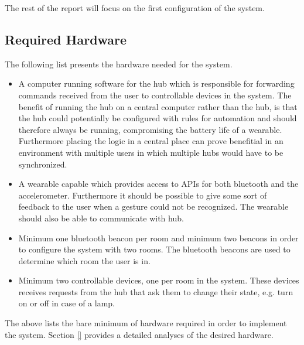 
The rest of the report will focus on the first configuration of the system.

\subsection{Required Hardware}
\label{sec:analysis:system-components:required-hardware}

The following list presents the hardware needed for the system.

\begin{itemize}
\item A computer running software for the hub which is responsible for forwarding commands received from the user to controllable devices in the system. The benefit of running the hub on a central computer rather than the hub, is that the hub could potentially be configured with rules for automation and should therefore always be running, compromising the battery life of a wearable. Furthermore placing the logic in a central place can prove benefitial in an environment with multiple users in which multiple hubs would have to be synchronized.
\item A wearable capable which provides access to APIs for both bluetooth and the accelerometer. Furthermore it should be possible to give some sort of feedback to the user when a gesture could not be recognized. The wearable should also be able to communicate with hub.
\item Minimum one bluetooth beacon per room and minimum two beacons in order to configure the system with two rooms. The bluetooth beacons are used to determine which room the user is in.
\item Minimum two controllable devices, one per room in the system. These devices receives requests from the hub that ask them to change their state, e.g. turn on or off in case of a lamp.
\end{itemize}

The above lists the bare minimum of hardware required in order to implement the system. Section \cref{} provides a detailed analyses of the desired hardware. 

